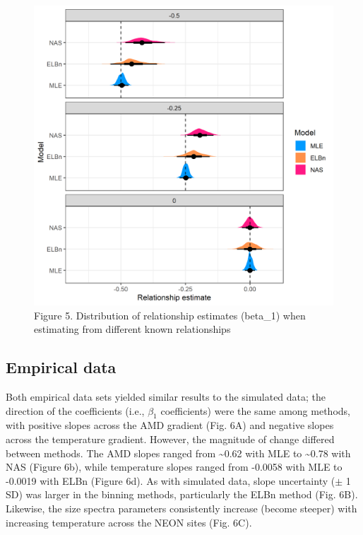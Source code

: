 \documentclass[
]{article}
\begin{document}
\begin{figure}
\centering
\includegraphics{figures/vary_beta_density_plot.png}
\caption{Figure 5. Distribution of relationship estimates (beta\_1) when
estimating from different known relationships}
\end{figure}

\hypertarget{empirical-data-1}{%
\subsection{Empirical data}\label{empirical-data-1}}

Both empirical data sets yielded similar results to the simulated data;
the direction of the coefficients (i.e., \(\beta_1\) coefficients) were
the same among methods, with positive slopes across the AMD gradient
(Fig. 6A) and negative slopes across the temperature gradient. However,
the magnitude of change differed between methods. The AMD slopes ranged
from \textasciitilde0.62 with MLE to \textasciitilde0.78 with NAS
(Figure 6b), while temperature slopes ranged from -0.0058 with MLE to
-0.0019 with ELBn (Figure 6d). As with simulated data, slope uncertainty
(\(\pm\) 1 SD) was larger in the binning methods, particularly the ELBn
method (Fig. 6B). Likewise, the size spectra parameters consistently
increase (become steeper) with increasing temperature across the NEON
sites (Fig. 6C).
\end{document}
